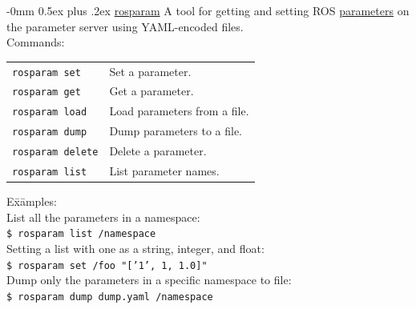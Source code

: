 \documentclass[10pt,landscape]{article}
\makeatletter
\renewcommand{\subsection}{\@startsection{subsection}{2}{0mm}%
                                {-0mm}%
                                {0.5ex plus .2ex}%
                                {\normalfont\normalsize\bfseries}}
\makeatother
\begin{document}
\begin{multicols}{3}
\subsection{\href{http://wiki.ros.org/rosparam}{rosparam}}
A tool for getting and setting ROS \href{http://wiki.ros.org/Parameter Server}{parameters} on the parameter server using YAML-encoded files.\\
\vspace{2.5 mm}
Commands: \\ 
\begin{tabular}{@{}p{\the\MyLen}%
                @{}p{\linewidth-\the\MyLen}@{}}
\texttt{rosparam set}    & Set a parameter. \\
\texttt{rosparam get}    & Get a parameter. \\
\texttt{rosparam load}   & Load parameters from a file. \\
\texttt{rosparam dump}   & Dump parameters to a file. \\
\texttt{rosparam delete} & Delete a parameter. \\
\texttt{rosparam list}   & List parameter names. 
\end{tabular}
\begin{tabbing}
E\=x\=amples:\\
\> List all the parameters in a namespace:\\
\> \>\texttt{\$ rosparam list /namespace}\\
\> Setting a list with one as a string, integer, and float:\\
\> \>\texttt{\$ rosparam set /foo "['1', 1, 1.0]"}\\
\> Dump only the parameters in a specific namespace to file:\\
\> \>\texttt{\$ rosparam dump dump.yaml /namespace}
\end{tabbing}

\vspace{-1.5 mm}

\end{multicols}
\end{document}
